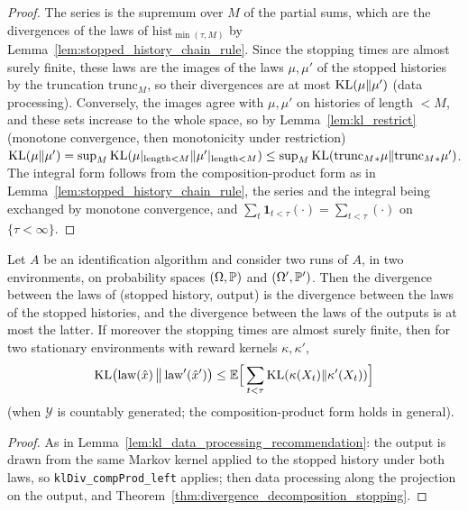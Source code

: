 \begin{proof}
\leanok
{}
The series is the supremum over $M$ of the partial sums, which are the divergences of the laws
of $\mathrm{hist}_{\min(\tau,M)}$ by Lemma~\ref{lem:stopped_history_chain_rule}. Since the
stopping times are almost surely finite, these laws are the images of the laws
$\mu,\mu'$ of the stopped histories by the truncation $\mathrm{trunc}_M$, so their divergences
are at most $\mathrm{KL}(\mu\|\mu')$ (data processing). Conversely, the images agree with $\mu,\mu'$ on
histories of length $< M$, and these sets increase to the whole space, so by
Lemma~\ref{lem:kl_restrict} (monotone convergence, then monotonicity under restriction)
$\mathrm{KL}(\mu\|\mu') = \sup_M\mathrm{KL}(\mu|_{\mathrm{length}<M}\|\mu'|_{\mathrm{length}<M}) \le \sup_M\mathrm{KL}(\mathrm{trunc}_M{}_*\mu\|\mathrm{trunc}_M{}_*\mu')$.
The integral form follows from the composition-product form as in
Lemma~\ref{lem:stopped_history_chain_rule}, the series and the integral being exchanged by
monotone convergence, and $\sum_t\mathbf 1_{t<\tau}(\cdot) = \sum_{t<\tau}(\cdot)$ on $\{\tau<\infty\}$.
\end{proof}

\begin{lemma}\label{lem:run_change_of_measure}
\leanok
{}
Let $A$ be an identification algorithm and consider two runs of $A$, in two environments, on
probability spaces $(\Omega,\mathbb{P})$ and $(\Omega',\mathbb{P}')$. Then the divergence between the laws
of (stopped history, output) is the divergence between the laws of the stopped histories, and
the divergence between the laws of the outputs is at most the latter. If moreover the stopping
times are almost surely finite, then for two stationary environments with reward kernels
$\kappa,\kappa'$,
\[
  \mathrm{KL}\big(\mathrm{law}(\hat{x})\,\big\|\,\mathrm{law}'(\hat{x}')\big)
  \le \mathbb{E}\Big[\sum_{t<\tau}\mathrm{KL}(\kappa(X_t)\|\kappa'(X_t))\Big]
\]
(when $\mathcal{Y}$ is countably generated; the composition-product form holds in general).
\end{lemma}

\begin{proof}
\leanok
{}
As in Lemma~\ref{lem:kl_data_processing_recommendation}: the output is drawn from the same
Markov kernel applied to the stopped history under both laws, so \texttt{klDiv\_compProd\_left}
applies; then data processing along the projection on the output, and
Theorem~\ref{thm:divergence_decomposition_stopping}.
\end{proof}

